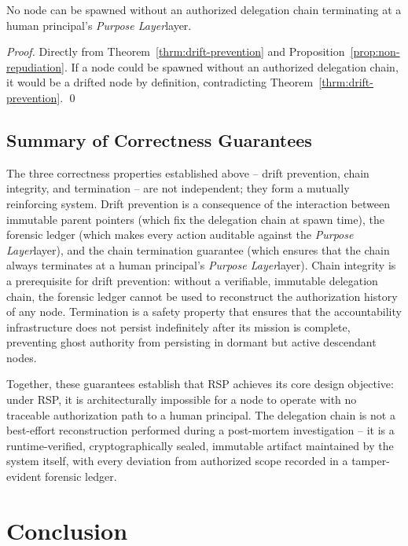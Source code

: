 \documentclass[12pt]{article}
\def\purpose{\textit{Purpose Layer}}
\begin{document}
\begin{cor}
\label{cor:ghost-authority}
No node can be spawned without an authorized delegation chain terminating at a human principal's \purpose layer.
\end{cor}

\begin{proof}
Directly from Theorem~\ref{thrm:drift-prevention} and Proposition~\ref{prop:non-repudiation}. If a node could be spawned without an authorized delegation chain, it would be a drifted node by definition, contradicting Theorem~\ref{thrm:drift-prevention}. \qed
\end{proof}

\subsection{Summary of Correctness Guarantees}

The three correctness properties established above -- drift prevention, chain integrity, and termination -- are not independent; they form a mutually reinforcing system. Drift prevention is a consequence of the interaction between immutable parent pointers (which fix the delegation chain at spawn time), the forensic ledger (which makes every action auditable against the \purpose layer), and the chain termination guarantee (which ensures that the chain always terminates at a human principal's \purpose layer). Chain integrity is a prerequisite for drift prevention: without a verifiable, immutable delegation chain, the forensic ledger cannot be used to reconstruct the authorization history of any node. Termination is a safety property that ensures that the accountability infrastructure does not persist indefinitely after its mission is complete, preventing ghost authority from persisting in dormant but active descendant nodes.

Together, these guarantees establish that RSP achieves its core design objective: under RSP, it is architecturally impossible for a node to operate with no traceable authorization path to a human principal. The delegation chain is not a best-effort reconstruction performed during a post-mortem investigation -- it is a runtime-verified, cryptographically sealed, immutable artifact maintained by the system itself, with every deviation from authorized scope recorded in a tamper-evident forensic ledger.

\section{Conclusion}
\label{sec:conclusion}
\end{document}
